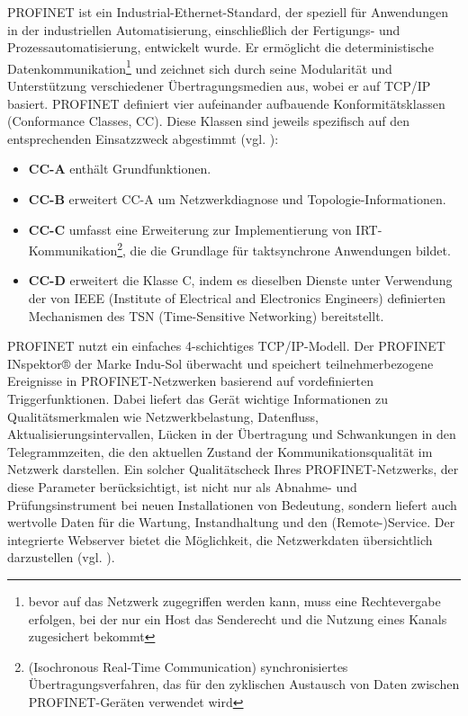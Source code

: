 PROFINET ist ein Industrial-Ethernet-Standard, der speziell für Anwendungen in der industriellen Automatisierung, einschließlich der Fertigungs- und Prozessautomatisierung, entwickelt wurde. Er ermöglicht die deterministische Datenkommunikation\footnote{bevor auf das Netzwerk zugegriffen werden kann, muss eine Rechtevergabe erfolgen, bei der nur ein Host das Senderecht und die Nutzung eines Kanals zugesichert bekommt} und zeichnet sich durch seine Modularität und Unterstützung verschiedener Übertragungsmedien aus, wobei er auf TCP/IP basiert. PROFINET definiert vier aufeinander aufbauende Konformitätsklassen (Conformance Classes, CC). Diese Klassen sind jeweils spezifisch auf den entsprechenden Einsatzzweck abgestimmt (vgl. \cite{IPInsider}):

\begin{itemize}
\item \textbf{CC-A} enthält Grundfunktionen.
\item \textbf{CC-B} erweitert CC-A um Netzwerkdiagnose und Topologie-Informationen.
\item \textbf{CC-C} umfasst eine Erweiterung zur Implementierung von IRT-Kommunikation\footnote{(Isochronous Real-Time Communication) synchronisiertes Übertragungsverfahren, das für den zyklischen Austausch von Daten zwischen PROFINET-Geräten verwendet wird}, die die Grundlage für taktsynchrone Anwendungen bildet.
\item \textbf{CC-D} erweitert die Klasse C, indem es dieselben Dienste unter Verwendung der von IEEE (Institute of Electrical and Electronics Engineers) definierten Mechanismen des TSN (Time-Sensitive Networking) bereitstellt.
\end{itemize} PROFINET nutzt ein einfaches 4-schichtiges TCP/IP-Modell. Der PROFINET INspektor® der Marke Indu-Sol überwacht und speichert teilnehmerbezogene Ereignisse in PROFINET-Netzwerken basierend auf vordefinierten Triggerfunktionen. Dabei liefert das Gerät wichtige Informationen zu Qualitätsmerkmalen wie Netzwerkbelastung, Datenfluss, Aktualisierungsintervallen, Lücken in der Übertragung und Schwankungen in den Telegrammzeiten, die den aktuellen Zustand der Kommunikationsqualität im Netzwerk darstellen. Ein solcher Qualitätscheck Ihres PROFINET-Netzwerks, der diese Parameter berücksichtigt, ist nicht nur als Abnahme- und Prüfungsinstrument bei neuen Installationen von Bedeutung, sondern liefert auch wertvolle Daten für die Wartung, Instandhaltung und den (Remote-)Service. Der integrierte Webserver bietet die Möglichkeit, die Netzwerkdaten übersichtlich darzustellen (vgl. \cite{InduSol}).
